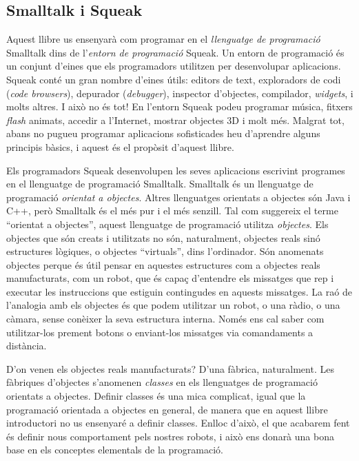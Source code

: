 \subsection{Smalltalk i Squeak}
Aquest llibre us ensenyarà com programar en el \emph{llenguatge de programació} Smalltalk dins de l'\emph{entorn de programació} Squeak. Un entorn de programació és un conjunt d'eines que els programadors utilitzen per desenvolupar aplicacions. Squeak conté un gran nombre d'eines útils: editors de text, exploradors de codi (\emph{code browsers}), depurador (\emph{debugger}), inspector d'objectes, compilador, \emph{widgets}, i molts altres. I això no és tot! En l'entorn Squeak podeu programar música, fitxers \emph{flash} animats, accedir a l'Internet, mostrar objectes 3D i molt més. Malgrat tot, abans no pugueu  programar aplicacions sofisticades heu d'aprendre alguns principis bàsics, i aquest és el propòsit d'aquest llibre.

Els programadors Squeak desenvolupen les seves aplicacions escrivint programes en el llenguatge de programació Smalltalk. Smalltalk és un llenguatge de programació \emph{orientat a objectes}. Altres llenguatges orientats a objectes són Java i C++, però Smalltalk és el més pur i el més senzill. Tal com suggereix el terme ``orientat a objectes'', aquest llenguatge de programació utilitza \emph{objectes}. Els objectes que són creats i utilitzats no són, naturalment, objectes reals sinó estructures lògiques, o objectes ``virtuals'', dins l'ordinador. Són anomenats objectes perque és útil pensar en aquestes estructures com a objectes reals manufacturats, com un robot, que és capaç d'entendre els missatges que rep i executar les instruccions que estiguin contingudes en aquests missatges. La raó de l'analogia amb els objectes és que podem utilitzar un robot, o una ràdio, o una càmara, sense conèixer la seva estructura interna. Només ens cal saber com utilitzar-los prement botons o enviant-los missatges via comandaments a distància.

D'on venen els objectes reals manufacturats? D'una fàbrica, naturalment. Les fàbriques d'objectes s'anomenen \emph{classes} en els llenguatges de programació orientats a objectes. Definir classes és una mica complicat, igual que la programació orientada a objectes en general, de manera que en aquest llibre introductori no us ensenyaré a definir classes. Enlloc d'això, el que acabarem fent és definir nous comportament pels nostres robots, i això ens donarà una bona base en els conceptes elementals de la programació.

